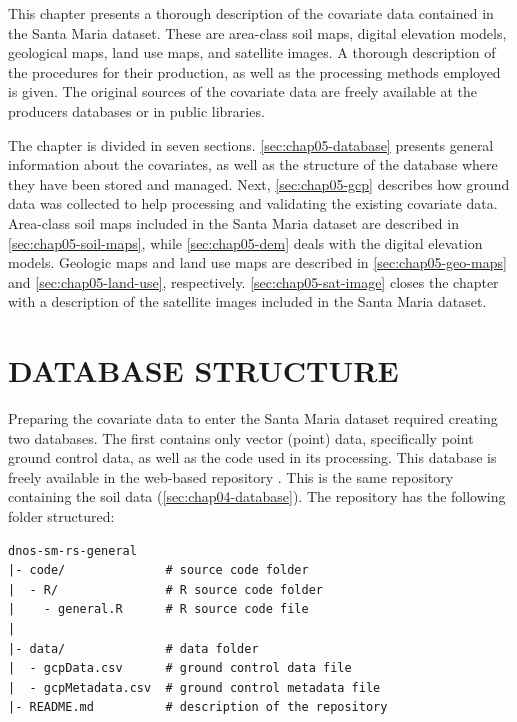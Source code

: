 This chapter presents a thorough description of the covariate data contained in the Santa Maria dataset. 
These are area-class soil maps, digital elevation models, geological maps, land use maps, and satellite 
images. A thorough description of the procedures for their production, as well as the processing methods 
employed is given. The original sources of the covariate data are freely available at the producers databases 
or in public libraries.

The chapter is divided in seven sections. \autoref{sec:chap05-database} presents general information about 
the covariates, as well as the structure of the database where they have been stored and managed. Next, 
\autoref{sec:chap05-gcp} describes how ground data was collected to help processing and validating the 
existing covariate data. Area-class soil maps included in the Santa Maria dataset are described in 
\autoref{sec:chap05-soil-maps}, while \autoref{sec:chap05-dem} deals with the digital elevation models. 
Geologic maps and land use maps are described in \autoref{sec:chap05-geo-maps} and 
\autoref{sec:chap05-land-use}, respectively. \autoref{sec:chap05-sat-image} closes the chapter with a 
description of the satellite images included in the Santa Maria dataset.

\section{DATABASE STRUCTURE}
\label{sec:chap05-database}

Preparing the covariate data to enter the Santa Maria dataset required creating two databases. The first 
contains only vector (point) data, specifically point ground control data, as well as the code used in its 
processing. This database is freely available in the web-based \git{} repository \github{}. This is the same 
repository containing the soil data (\autoref{sec:chap04-database}). The repository has the following folder 
structured:

\begin{verbatim}
dnos-sm-rs-general
|- code/              # source code folder
|  - R/               # R source code folder
|    - general.R      # R source code file
|
|- data/              # data folder
|  - gcpData.csv      # ground control data file
|  - gcpMetadata.csv  # ground control metadata file
|- README.md          # description of the repository
\end{verbatim}

\def\sirgas{\href{http://spatialreference.org/ref/epsg/31982/}{\texttt{EPSG:31982}}}

